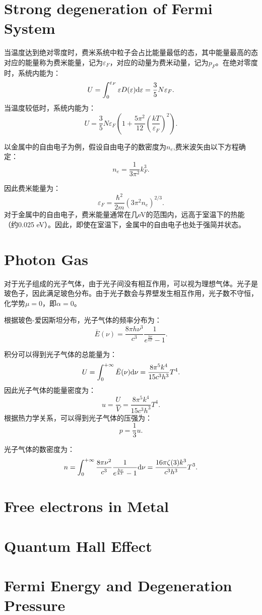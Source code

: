 \section{Strong degeneration of Fermi System}
当温度达到绝对零度时，费米系统中粒子会占比能量最低的态，其中能量最高的态对应的能量称为费米能量，记为$\varepsilon_F$，对应的动量为费米动量，记为$p_F$。在绝对零度时，系统内能为：
\begin{equation}
    U=\int_0^{\varepsilon_F}\varepsilon D(\varepsilon)\mathrm{d}\varepsilon=\frac{3}{5}N\varepsilon_F.
\end{equation}
当温度较低时，系统内能为：
\begin{equation}
    U=\frac{3}{5}N\varepsilon_F\left(1+\frac{5\pi^2}{12}\left(\frac{kT}{\varepsilon_F   }\right)^2\right).
\end{equation}

以金属中的自由电子为例，假设自由电子的数密度为$n_e$,费米波矢由以下方程确定：
\begin{equation}
    n_e=\frac{1}{3\pi^2}k_F^3.
\end{equation}

因此费米能量为：
\begin{equation}
    \varepsilon_F=\frac{\hbar^2}{2m}(3\pi^2n_e)^{2/3}.
\end{equation}
对于金属中的自由电子，费米能量通常在几eV的范围内，远高于室温下的热能（约0.025 eV）。因此，即使在室温下，金属中的自由电子也处于强简并状态。
\section{Photon Gas}
对于光子组成的光子气体，由于光子间没有相互作用，可以视为理想气体。光子是玻色子，因此满足玻色分布。由于光子数会与界壁发生相互作用，光子数不守恒，化学势$\mu=0$，即$\alpha=0$。

根据玻色-爱因斯坦分布，光子气体的频率分布为：
\begin{equation}
    \bar{E}(\nu)=\frac{8\pi h\nu^3}{c^3}\frac{1}{e^{\frac{h\nu}{kT}}-1}.    
\end{equation}

积分可以得到光子气体的总能量为：
\begin{equation}
    U=\int_0^{+\infty}\bar{E}(\nu)\mathrm{d}\nu=\frac{8\pi^5k^4}{15c^3h^3}T^4.
\end{equation}
因此光子气体的能量密度为：
\begin{equation}
    u=\frac{U}{V}=\frac{8\pi^5k^4}{15c^3h^3}T^4.
\end{equation}
根据热力学关系，可以得到光子气体的压强为：
\begin{equation}
    p=\frac{1}{3}u.
\end{equation}

光子气体的数密度为：
\begin{equation}    
    n=\int_0^{+\infty}\frac{8\pi\nu^2}{c^3}\frac{1}{e^{\frac{h\nu}{kT}}-1}\mathrm{d}\nu=\frac{16\pi\zeta(3)k^3}{c^3h^3}T^3.
\end{equation}
\section{Free electrons in Metal}
\section{Quantum Hall Effect}
\section{Fermi Energy and Degeneration Pressure}
